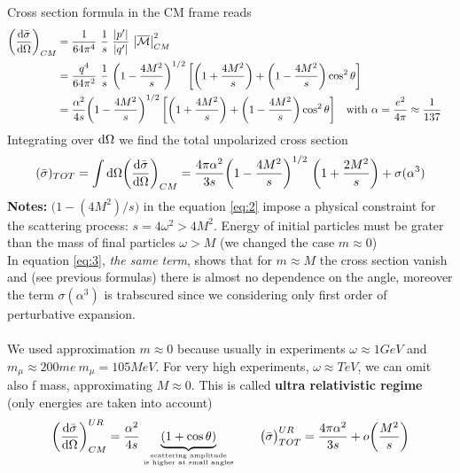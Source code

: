 \documentclass[TheoreticalPhy_ModB.tex]{subfiles}
\begin{document}
Cross section formula in the CM frame reads
\begin{align}
\biggl( \frac{\textup{d} \bar{\sigma}}{\textup{d} \Omega} \biggr)_{CM}
	& = \frac{1}{64\pi^4} \ \frac{1}{s} \ \frac{\abs{p'}}{\abs{q'}} \ \abs{\overline{\mathcal{M}}}^2_{CM} \notag \\
	& = \frac{q^4}{64 \pi^2} \ \frac{1}{s} \ \biggl( 1 - \frac{4M^2}{s} \biggr)^{1/2} \, 
		\biggl[ \biggl( 1 + \frac{4M^2}{s} \biggr) + \biggl( 1 - \frac{4M^2}{s} \biggr) \cos^2 \theta \biggr] \notag \\
	& = \frac{\alpha^2}{4s} \biggl( 1 - \frac{4M^2}{s} \biggr)^{1/2} \,
		\biggl[ \biggl( 1 + \frac{4M^2}{s} \biggr) + \biggl( 1 - \frac{4M^2}{s} \biggr) \cos^2 \theta \biggr]
		\quad \textup{with } \alpha = \frac{e^2}{4 \pi} \approx \frac{1}{137}	
		\label{eq:2}&
\end{align}
Integrating over $\textup{d} \Omega$ we find the total unpolarized cross section
\begin{equation}
(\bar{\sigma})_{TOT} = \int \de \Omega \biggl( \frac{\de \bar{\sigma}}{\de \Omega} \biggr)_{CM}
= \frac{4 \pi \alpha^2}{3s} \biggl( 1 - \frac{4M^2}{s} \biggr)^{1/2} \ \biggl( 1 + \frac{2M^2}{s} \biggr) + \sigma(\alpha^3)
\label{eq:3}
\end{equation}
\textbf{Notes: } $\bigl( 1 - (4M^2)/s \bigr)$ in the equation \ref{eq:2} impose a physical constraint for the scattering process: $s = 4\omega^2 > 4M^2$.
Energy of initial particles must be grater than the mass of final particles $\omega > M$ (we changed the case $m \approx 0$)\\
In equation \ref{eq:3}, \emph{the same term}, shows that for $m \approx M$ the cross section vanish and (see previous formulas) there is almost no dependence on the angle, moreover the term $\sigma(\alpha^3)$ is trabscured since we considering only first order of perturbative expansion.\\ \\
We used approximation $m \approx 0$ because usually in experiments $\omega \approx 1 GeV$ and $m_{\mu} \approx 200 me \ m_{\mu} = 105 MeV$. For very high experiments, $\omega \approx TeV$, we can omit also f mass, approximating $M \approx 0$. This is called \textbf{ultra relativistic regime} (only energies are taken into account)
\begin{equation}\label{eqn:electr-muon-scatt-QED-UR}
\biggl( \frac{\textup{d} \bar{\sigma}}{\textup{d} \Omega} \biggr)_{CM}^{UR} =
	\frac{\alpha^2}{4s} \underbrace{(1 + \cos \theta)}_{\text{scattering amplitude} \atop \text{is higher at small angles}}
\qquad
\bigl( \bar{\sigma} \bigr)^{UR}_{TOT} = \frac{4 \pi \alpha^2}{3s} + o \biggl( \frac{M^2}{s} \biggr)
\end{equation}
\end{document}
